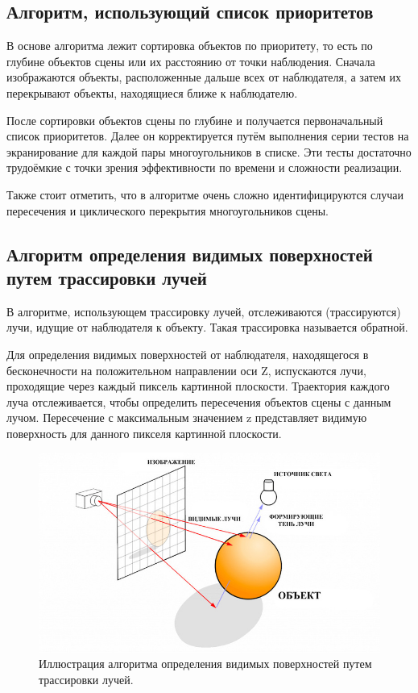 \subsection{Алгоритм, использующий список приоритетов}
В основе алгоритма лежит сортировка объектов по приоритету, то есть по глубине объектов сцены или их расстоянию от точки наблюдения. Сначала изображаются объекты, расположенные дальше всех от наблюдателя, а затем их перекрывают объекты, находящиеся ближе к наблюдателю.

После сортировки объектов сцены по глубине и получается первоначальный список приоритетов. Далее он корректируется путём выполнения серии тестов на экранирование для каждой пары многоугольников в списке. Эти тесты достаточно трудоёмкие с точки зрения эффективности по времени и сложности реализации.

Также стоит отметить, что в алгоритме очень сложно идентифицируются случаи пересечения и циклического перекрытия многоугольников сцены.

\subsection{Алгоритм определения видимых поверхностей путем трассировки лучей}
В алгоритме, использующем трассировку лучей, отслеживаются (трассируются) лучи, идущие от наблюдателя к объекту. Такая трассировка называется обратной.

Для определения видимых поверхностей от наблюдателя, находящегося в бесконечности на положительном направлении оси Z, испускаются лучи, проходящие через каждый пиксель картинной плоскости. Траектория каждого луча отслеживается, чтобы определить пересечения объектов сцены с данным лучом. Пересечение с максимальным значением z представляет видимую поверхность для данного пикселя картинной плоскости.

\begin{figure}[h]
	\centering
	\includegraphics[width=\textwidth ]{img/raytracing.png}
	\caption{Иллюстрация алгоритма определения видимых поверхностей путем трассировки лучей.}
\end{figure} 

